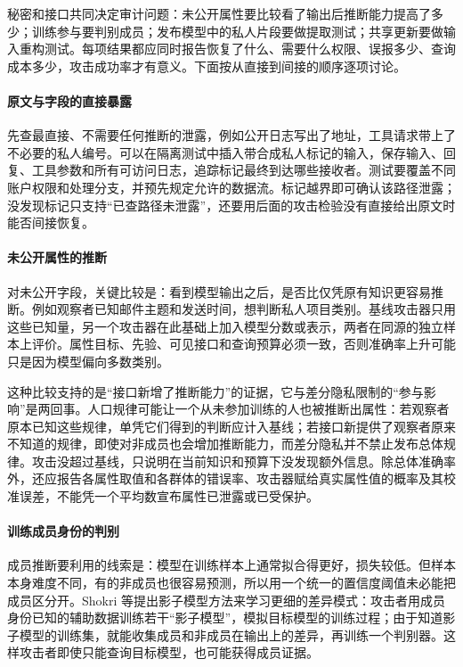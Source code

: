 秘密和接口共同决定审计问题：未公开属性要比较看了输出后推断能力提高了多少；训练参与要判别成员；发布模型中的私人片段要做提取测试；共享更新要做输入重构测试。每项结果都应同时报告恢复了什么、需要什么权限、误报多少、查询成本多少，攻击成功率才有意义。下面按从直接到间接的顺序逐项讨论。

\paragraph{原文与字段的直接暴露}

先查最直接、不需要任何推断的泄露，例如公开日志写出了地址，工具请求带上了不必要的私人编号。可以在隔离测试中插入带合成私人标记的输入，保存输入、回复、工具参数和所有可访问日志，追踪标记最终到达哪些接收者。测试要覆盖不同账户权限和处理分支，并预先规定允许的数据流。标记越界即可确认该路径泄露；没发现标记只支持“已查路径未泄露”，还要用后面的攻击检验没有直接给出原文时能否间接恢复。

\paragraph{未公开属性的推断}

对未公开字段，关键比较是：看到模型输出之后，是否比仅凭原有知识更容易推断。例如观察者已知邮件主题和发送时间，想判断私人项目类别。基线攻击器只用这些已知量，另一个攻击器在此基础上加入模型分数或表示，两者在同源的独立样本上评价。属性目标、先验、可见接口和查询预算必须一致，否则准确率上升可能只是因为模型偏向多数类别。

这种比较支持的是“接口新增了推断能力”的证据，它与差分隐私限制的“参与影响”是两回事。人口规律可能让一个从未参加训练的人也被推断出属性：若观察者原本已知这些规律，单凭它们得到的判断应计入基线；若接口新提供了观察者原来不知道的规律，即使对非成员也会增加推断能力，而差分隐私并不禁止发布总体规律。攻击没超过基线，只说明在当前知识和预算下没发现额外信息。除总体准确率外，还应报告各属性取值和各群体的错误率、攻击器赋给真实属性值的概率及其校准误差，不能凭一个平均数宣布属性已泄露或已受保护。

\paragraph{训练成员身份的判别}

成员推断要利用的线索是：模型在训练样本上通常拟合得更好，损失较低。但样本本身难度不同，有的非成员也很容易预测，所以用一个统一的置信度阈值未必能把成员区分开。Shokri 等提出影子模型方法来学习更细的差异模式：攻击者用成员身份已知的辅助数据训练若干“影子模型”，模拟目标模型的训练过程；由于知道影子模型的训练集，就能收集成员和非成员在输出上的差异，再训练一个判别器。这样攻击者即使只能查询目标模型，也可能获得成员证据。

